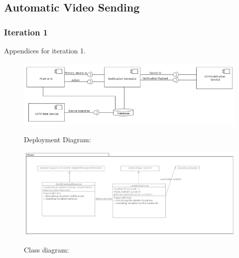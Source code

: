 \documentclass{article}
\begin{document}
	
    \subsection{Automatic Video Sending}
    \subsubsection{Iteration 1} Appendices for iteration 1.
    


	\begin{figure}[h]
		\centering
		\includegraphics[width=1\textwidth]{"Auto/1"}

		Deployment Diagram:
	\end{figure}
	
	
	
	
	\begin{figure}[h]
		\centering
		\includegraphics[width=1\textwidth]{"Auto/2"}

		Class diagram:
	\end{figure} \clearpage
	
	
	
	
	
\end{document}

